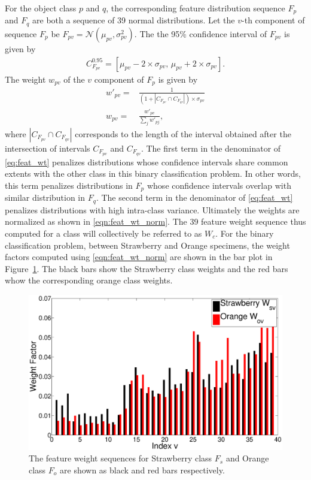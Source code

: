 \documentclass {udthesis}
\begin{document}
For the object class $p$ and $q$, the corresponding feature distribution sequence $F_p$ and $F_q$ are both a sequence of 39 normal distributions. Let the $v$-th component of sequence $F_p$ be $F_{pv}=\mathcal{N}(\mu_{pv},\sigma^2_{pv})$.
The the 95\% confidence interval of $F_{pv}$ is given by
%
\begin{align}	\label{eqn:conf_interval}
C^{0.95}_{F_{pv}}=[\mu_{pv}-2 \times \sigma_{pv},\, \mu_{pv}+2 \times \sigma_{pv}].
\end{align}
%
The weight $w_{pv}$ of the $v$ component of $F_p$ is given by
\begin{align}
 w'_{pv}= & \frac{1}{(1+ |C_{F_{pv}} \cap C_{F_{qv}}| )\times \sigma_{pv}} \label{eq:feat_wt}\\
 w_{pv}= & \frac{w'_{pv}}{\sum_{j} w'_{pj}}, \label{eqn:feat_wt_norm}
\end{align}
where $|C_{F_{pv}} \cap C_{F_{qv}}|$ corresponds to the length of the interval obtained after the intersection of intervals $C_{F_{pv}}$ and $C_{F_{qv}}$. The first term in the denominator of \eqref{eq:feat_wt} penalizes distributions whose confidence intervals share common extents with the other class in this binary classification problem. In other words, this term penalizes distributions in $F_p$ whose confidence intervals overlap with similar  distribution in $F_q$. The second term in the denominator of \eqref{eq:feat_wt} penalizes distributions with high intra-class variance. Ultimately the weights are normalized as shown in \eqref{eqn:feat_wt_norm}. The 39 feature weight sequence thus computed for a class will collectively be referred to as $W_c$. For the binary classification problem, between Strawberry and Orange specimens, the weight factors computed using \eqref{eqn:feat_wt_norm} are shown in the bar plot in Figure~\ref{fig:feat_weights}. The black bars show the Strawberry class weights and the red 
bars whow the corresponding orange class weights.
%
\begin{figure}
  \centering
  \includegraphics[width=\textwidth]{feature_weights}
  \caption[Feature weights]{The feature weight sequences for Strawberry class $F_s$ and  Orange class $F_o$ are shown as black and red bars respectively.}
  \label{fig:feat_weights}
\end{figure}	
%
\end{document}
